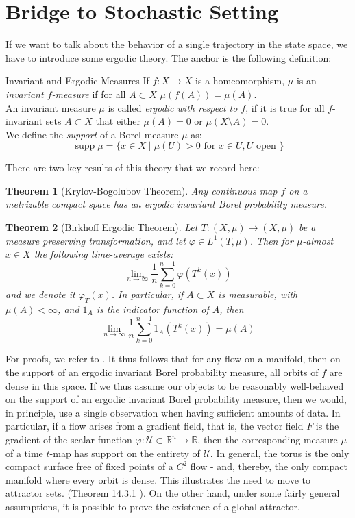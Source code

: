 \documentclass[11pt, a4paper]{memoir}
\theoremstyle{break}
\newtheorem{thm}{Theorem}
\theoremstyle{break}
\theoremstyle{nonumberplain}
\newcommand{\mR}{\mathbb{R}}
\DeclareMathOperator{\supp}{supp}
\begin{document}
\section{Bridge to Stochastic Setting}
If we want to talk about the behavior of a single trajectory in the state space, we have to introduce some ergodic theory. The anchor is the following definition:
\begin{mydefinition}{Invariant and Ergodic Measures}
If $f:X\to X$ is a homeomorphism, $\mu$ is an \emph{invariant $f$-measure} if for all $A\subset X$ $\mu(f(A))=\mu(A)$.\\[5pt]
An invariant measure $\mu$ is called \emph{ergodic with respect to $f$}, if it is true for all $f$-invariant sets $A\subset X$ that either $\mu(A)=0$ or $\mu(X\setminus A)=0$.\\[5pt]
We define the \emph{support} of a Borel measure $\mu$ as:
$$\supp \mu=\{x\in X\mid \mu(U)>0 \text{ for } x\in U, U \text{ open }\}$$
\end{mydefinition}
There are two key results of this theory that we record here:
\begin{thm}[Krylov-Bogolubov Theorem]
Any continuous map $f$ on a metrizable compact space has an ergodic invariant Borel probability measure.
\end{thm}
\begin{thm}[Birkhoff Ergodic Theorem]
Let $T:(X,\mu)\to (X,\mu)$ be a measure preserving transformation, and let $\varphi\in L^1(T,\mu)$. Then for $\mu$-almost $x\in X$ the following time-average exists:
$$\lim_{n\to\infty}\frac{1}{n}\sum_{k=0}^{n-1}\varphi(T^k(x))$$
and we denote it $\varphi_T(x)$. In particular, if $A\subset X$ is measurable, with $\mu(A)<\infty$, and $1_A$ is the indicator function of $A$, then
$$\lim_{n\to\infty}\frac{1}{n}\sum_{k=0}^{n-1}1_A(T^k(x))=\mu(A)$$
\end{thm}
For proofs, we refer to \cite{Katok}. It thus follows that for any flow on a manifold, then on the support of an ergodic invariant Borel probability measure, all orbits of $f$ are dense in this space. If we thus assume our objects to be reasonably well-behaved on the support of an ergodic invariant Borel probability measure, then we would, in principle, use a single observation when having sufficient amounts of data. In particular, if a flow arises from a gradient field, that is, the vector field $F$ is the gradient of the scalar function $\varphi: \mathcal{U}\subset \mR^n\to \mR$, then the corresponding measure $\mu$ of a time $t$-map has support on the entirety of $\mathcal{U}$. In general, the torus is the only compact surface free of fixed points of a $C^2$ flow - and, thereby, the only compact manifold where every orbit is dense. This illustrates the need to move to attractor sets. (Theorem 14.3.1 \cite{Katok}). On the other hand, under some fairly general assumptions, it is possible to prove the existence of a global attractor.
\end{document}
